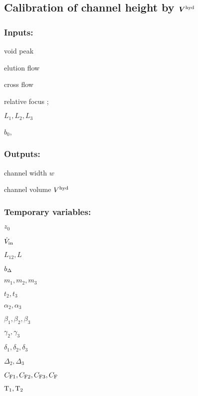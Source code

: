 \subsection*{Calibration of channel height by $\bm{V^\text{hyd}}$}
\subsubsection*{Inputs:}
\label{sec:CalibVhyd}
\begin{multicols}{3}
  \begin{packed_item}
    \item void peak \tvoid
    \item elution flow \Ve
    \item cross flow \Vc
    \item relative focus \zP;
    \item $L_1, L_2, L_3$
    \item $b_0$, \bL
  \end{packed_item}
\end{multicols}

\subsubsection*{Outputs:}
\begin{multicols}{3}
  \begin{packed_item}
    \item channel width $w$
    \item channel volume $V^\text{hyd}$
  \end{packed_item}
\end{multicols}

\subsubsection*{Temporary variables:}
\begin{multicols}{3}
  \begin{packed_item}
  \item $z_0$
  \item $\dot{V}_\text{in}$
  \item $L_{12}, L$  
  \item $b_\Delta$
  \item $m_1, m_2, m_3$
  \item $t_2, t_3$
  \item $α_2, α_3$
  \item $β_1, β_2, β_3$
  \item $γ_2, γ_3$
  \item $δ_1, δ_2, δ_3$
  \item $Δ_2, Δ_3$
  \item $C_\text{F1}, C_\text{F2}, C_\text{F3}, C_\text{F}$
 \item $\text{T}_{1}, \text{T}_{2}$
  \end{packed_item}
\end{multicols}
